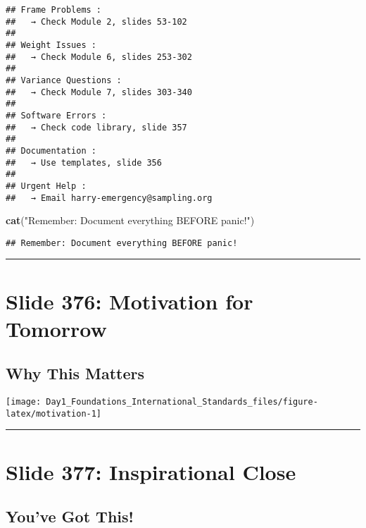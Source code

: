 \documentclass[
]{article}
\newenvironment{Shaded}{\begin{snugshade}}{\end{snugshade}}
\newcommand{\FunctionTok}[1]{\textcolor[rgb]{0.13,0.29,0.53}{\textbf{#1}}}
\newcommand{\NormalTok}[1]{#1}
\newcommand{\StringTok}[1]{\textcolor[rgb]{0.31,0.60,0.02}{#1}}
\begin{document}
\begin{verbatim}
## Frame Problems :
##   → Check Module 2, slides 53-102 
## 
## Weight Issues :
##   → Check Module 6, slides 253-302 
## 
## Variance Questions :
##   → Check Module 7, slides 303-340 
## 
## Software Errors :
##   → Check code library, slide 357 
## 
## Documentation :
##   → Use templates, slide 356 
## 
## Urgent Help :
##   → Email harry-emergency@sampling.org
\end{verbatim}

\begin{Shaded}
\begin{Highlighting}[]
\FunctionTok{cat}\NormalTok{(}\StringTok{"Remember: Document everything BEFORE panic!"}\NormalTok{)}
\end{Highlighting}
\end{Shaded}

\begin{verbatim}
## Remember: Document everything BEFORE panic!
\end{verbatim}

\begin{center}\rule{0.5\linewidth}{0.5pt}\end{center}

\section{Slide 376: Motivation for
Tomorrow}\label{slide-376-motivation-for-tomorrow}

\subsection{Why This Matters}\label{why-this-matters}

\texttt{[image: Day1\_Foundations\_International\_Standards\_files/figure-latex/motivation-1]}

\begin{center}\rule{0.5\linewidth}{0.5pt}\end{center}

\section{Slide 377: Inspirational
Close}\label{slide-377-inspirational-close}

\subsection{You've Got This!}\label{youve-got-this}
\end{document}
